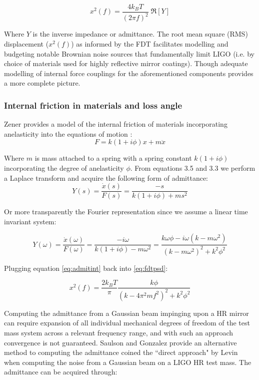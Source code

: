 \begin{equation}\label{eq:fdtpsd}
x^2 (f)  = \frac{4k_B T}{(2 \pi f)^2}\; \Re[Y]
\end{equation}

\noindent Where $Y$ is the inverse impedance or admittance. The root mean square (RMS) displacement ($x^2(f)$) as informed by the FDT facilitates modelling and budgeting notable Brownian noise sources that fundamentally limit LIGO (i.e. by choice of materials used for highly reflective mirror coatings). Though adequate modelling of internal force couplings for the aforementioned components provides a more complete picture.

\subsubsection*{Internal friction in materials and loss angle}
Zener provides a model of the internal friction of materials incorporating anelasticity into the equations of motion \cite{zener:1948}:
\begin{equation}
F = k(1+i\phi)x + m\ddot{x}
\end{equation}

\noindent Where $m$ is mass attached to a spring with a spring constant $k(1+ i\phi)$ incorporating the degree of anelasticity $\phi$. From equations 3.5 and 3.3 we perform a Laplace transform and acquire the following form of admittance:
\begin{equation}
Y(s) = \frac{\dot{x}(s)}{F(s)} = \frac{-s}{k(1+i\phi) + ms^2}
\end{equation}

\noindent Or more transparently the Fourier representation since we assume a linear time invariant system:

\begin{equation}\label{eq:admitint}
Y(\omega) = \frac{\dot{x}(\omega)}{F(\omega)} = \frac{-i\omega}{k(1+i\phi) - m\omega^2} = \frac{k \omega \phi - i \omega (k - m \omega^2)}{(k-m\omega^2)^2 +k^2 \phi^2}
\end{equation}

\noindent Plugging equation \autoref{eq:admitint} back into \autoref{eq:fdtpsd}:

\begin{equation}
x^2 (f)  = \frac{2k_B T}{\pi}\frac{k\phi}{(k-4\pi^2 m f^2)^2 + k^2 \phi^2}
\end{equation}

Computing the admittance from a Gaussian beam impinging upon a HR mirror can require expansion of all individual mechanical degrees of freedom of the test mass system across a relevant frequency range, and with such an approach convergence is not guaranteed. Saulson and Gonzalez provide an alternative method to computing the admittance coined the ``direct approach" by Levin when computing the noise from a Gaussian beam on a LIGO HR test mass. The admittance can be acquired through:

